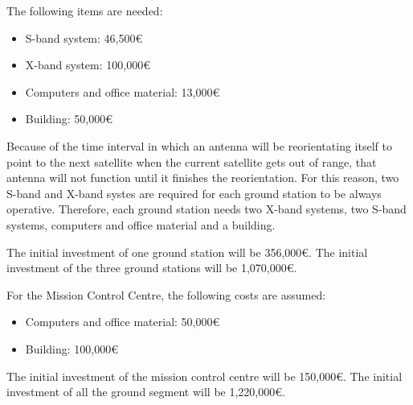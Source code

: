 The following items are needed:
\begin{itemize}
\item S-band system: 46,500\euro
\item X-band system: 100,000\euro
\item Computers and office material: 13,000\euro
\item Building: 50,000\euro
\end{itemize}

Because of the time interval in which an antenna will be reorientating itself to point to the next satellite when the current satellite gets out of range, that antenna will not function until it finishes the reorientation. For this reason, two S-band and X-band systes are required for each ground station to be always operative. Therefore, each ground station needs two X-band systems, two S-band systems, computers and office material and a building.

The initial investment of one ground station will be 356,000\euro . The initial investment of the three ground stations will be 1,070,000\euro .

For the Mission Control Centre, the following costs are assumed:
\begin{itemize}
\item Computers and office material: 50,000\euro
\item Building: 100,000\euro
\end{itemize}

The initial investment of the mission control centre will be 150,000\euro . The initial investment of all the ground segment will be 1,220,000\euro .